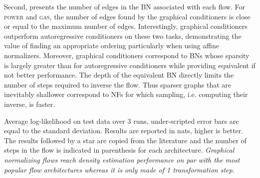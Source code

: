 Second,  presents the number of edges in the BN associated with each flow. For \textsc{power} and \textsc{gas}, the number of edges found by the graphical conditioners is close or equal to the maximum number of edges. Interestingly, graphical conditioners outperform  autoregressive conditioners on these two tasks, demonstrating the value of finding an appropriate ordering particularly when using affine normalizers. Moreover, graphical conditioners correspond to BNs whose sparsity is largely greater than for autoregressive conditioners while providing equivalent if not better performance. The depth \citep{depth-dag} of the equivalent BN directly limits the number of steps required to inverse the flow. Thus sparser graphs that are inevitably shallower correspond to NFs for which sampling, i.e. computing their inverse, is faster.
\begin{table}
    \caption{Average log-likelihood on test data over 3 runs, under-scripted error bars are equal to the standard deviation. Results are reported in nats, higher is better. The results followed by a star are copied from the literature and the number of steps in the flow is indicated in parenthesis for each architecture. \textit{Graphical normalizing flows reach density estimation performance on par with the most popular flow architectures whereas it is only made of 1 transformation step.}} \label{tab:tabular_density_all}
    \centering
    \scriptsize
    \setlength{\tabcolsep}{0pt}
    \renewcommand{\arraystretch}{1.5}


\end{table}
